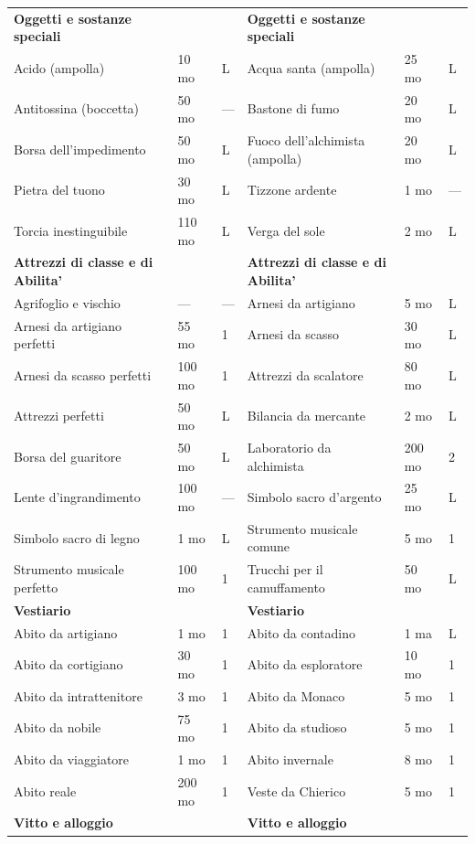\documentclass[a4paper,11pt,twoside,openany]{book}
\begin{document}
\begin{tabularx}{\textwidth}{XllXll}
	\textbf{Oggetti e sostanze speciali}&    & & \textbf{Oggetti e sostanze speciali}&& \\
	Acido (ampolla)   & 10 mo    & L& Acqua santa (ampolla)   & 25 mo& L\\
	Antitossina (boccetta)  & 50 mo    & —& Bastone di fumo   & 20 mo& L\\
	Borsa dell’impedimento  & 50 mo    & L& Fuoco dell’alchimista (ampolla)& 20 mo& L\\
	Pietra del tuono  & 30 mo    & L& Tizzone ardente   & 1 mo& —\\
	Torcia inestinguibile   & 110 mo   & L& Verga del sole    & 2 mo& L\\
	\textbf{Attrezzi di classe e di Abilita'} &    & & \textbf{Attrezzi di classe e di Abilita'} && \\
	Agrifoglio e vischio    & —  & —& Arnesi da artigiano& 5 mo& L\\
	Arnesi da artigiano perfetti  & 55 mo    & 1& Arnesi da scasso  & 30 mo& L\\
	Arnesi da scasso perfetti& 100 mo   & 1& Attrezzi da scalatore   & 80 mo& L\\
	Attrezzi perfetti & 50 mo    & L& Bilancia da mercante    & 2 mo& L\\
	Borsa del guaritore& 50 mo    & L& Laboratorio da alchimista& 200 mo    & 2\\
	Lente d’ingrandimento   & 100 mo   & —& Simbolo sacro d’argento & 25 mo& L\\
	Simbolo sacro di legno  & 1 mo& L& Strumento musicale comune& 5 mo& 1\\
	Strumento musicale perfetto   & 100 mo   & 1& Trucchi per il camuffamento   & 50 mo& L\\
	\textbf{Vestiario}&    & & \textbf{Vestiario}&& \\
	Abito da artigiano& 1 mo& 1& Abito da contadino& 1 ma& L\\
	Abito da cortigiano& 30 mo    & 1& Abito da esploratore    & 10 mo& 1\\
	Abito da intrattenitore & 3 mo& 1& Abito da Monaco   & 5 mo& 1\\
	Abito da nobile   & 75 mo    & 1& Abito da studioso & 5 mo& 1\\
	Abito da viaggiatore    & 1 mo& 1& Abito invernale   & 8 mo& 1\\
	Abito reale & 200 mo   & 1& Veste da Chierico & 5 mo& 1\\
	\textbf{Vitto e alloggio}&    & & \textbf{Vitto e alloggio}&& \\

\end{tabularx}
\end{document}
